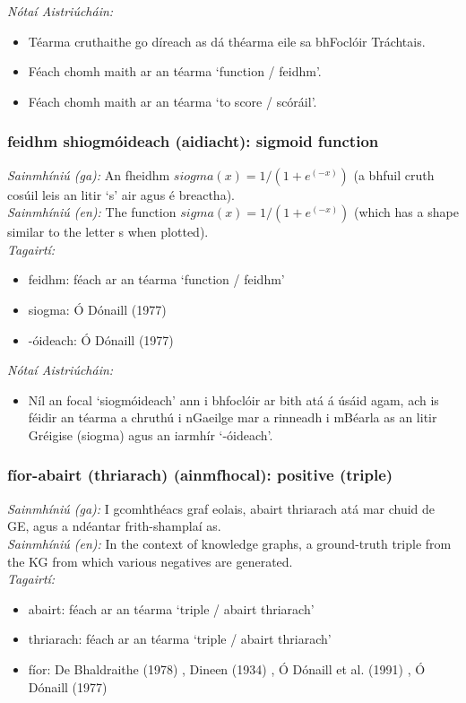  \noindent \textit{Nótaí Aistriúcháin:}
\begin{itemize}
	\item Téarma cruthaithe go díreach as dá théarma eile sa bhFoclóir Tráchtais.
	\item Féach chomh maith ar an téarma `function / feidhm'.
	\item Féach chomh maith ar an téarma `to score / scóráil'.
\end{itemize}


\subsubsection*{feidhm shiogmóideach (aidiacht): sigmoid function}
 \noindent \textit{Sainmhíniú (ga):} An fheidhm $siogma(x) = 1 / (1 + e^(-x))$ (a bhfuil cruth cosúil leis an litir `s' air agus é breactha).
\\
 \noindent \textit{Sainmhíniú (en):} The function $sigma(x) = 1 / (1 + e^(-x))$ (which has a shape similar to the letter s when plotted).
\\
 \noindent \textit{Tagairtí:}
\begin{itemize}
	\item feidhm: féach ar an téarma `function / feidhm'
	\item siogma: Ó Dónaill (1977) \cite{odonaill}
	\item -óideach: Ó Dónaill (1977) \cite{odonaill}
\end{itemize}

 \noindent \textit{Nótaí Aistriúcháin:}
\begin{itemize}
	\item Níl an focal `siogmóideach' ann i bhfoclóir ar bith atá á úsáid agam, ach is féidir an téarma a chruthú i nGaeilge mar a rinneadh i mBéarla as an litir Gréigise (siogma) agus an iarmhír `-óideach'.
\end{itemize}


\subsubsection*{fíor-abairt (thriarach) (ainmfhocal): positive (triple)}
 \noindent \textit{Sainmhíniú (ga):} I gcomhthéacs graf eolais, abairt thriarach atá mar chuid de GE, agus a ndéantar frith-shamplaí as.
\\
 \noindent \textit{Sainmhíniú (en):} In the context of knowledge graphs, a ground-truth triple from the KG from which various negatives are generated.
\\
 \noindent \textit{Tagairtí:}
\begin{itemize}
	\item abairt: féach ar an téarma `triple / abairt thriarach'
	\item thriarach: féach ar an téarma `triple / abairt thriarach'
	\item fíor: De Bhaldraithe (1978) \cite{de-bhaldraithe}, Dineen (1934) \cite{dineen}, Ó Dónaill et al. (1991) \cite{focloir-beag}, Ó Dónaill (1977) \cite{odonaill}
\end{itemize}


